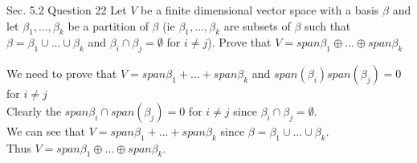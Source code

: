 \documentclass[answers,12pt,addpoints]{exam}
\begin{document}
\begin{questions}
    \question[10] Sec. 5.2 Question 22
    Let $V$ be a finite dimensional vector space with a basis $\beta$ and let $\beta_1 , \dots, \beta_k$ be a partition of $\beta$ (ie $\beta_1, \dots, \beta_k$ are subsets of $\beta$ such that $\beta = \beta_1 \cup \dots \cup \beta_k$ and $\beta_i \cap \beta_j = \emptyset$ for $i \neq j$). Prove that $V = span{\beta_1} \oplus \dots \oplus span{\beta_k}$ 
    \begin{solution}
        We need to prove that $V = span{\beta_1} + \dots + span{\beta_k}$ and $span(\beta_i) span(\beta_j) = 0$ for $i \neq j$\\
        Clearly the $span{\beta_i} \cap span(\beta_j) = 0$ for $i \neq j$ since $\beta_i \cap \beta_j = \emptyset$.\\
        We can see that $V = span{\beta_1} + \dots + span{\beta_k}$ since $\beta = \beta_1 \cup \dots \cup \beta_k$.\\
        Thus $V = span{\beta_1} \oplus \dots \oplus span{\beta_k}$.
    \end{solution}
    \end{questions}

    
\end{document}
